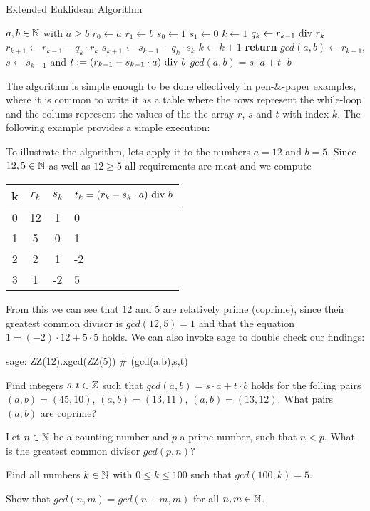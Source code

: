 \begin{algorithm}\caption{Extended Euklidean Algorithm}
\label{alg_ext_euclid_alg}
\begin{algorithmic}[0]
\Require $a,b \in \mathbb{N}$ with $a\geq b$
\State $r_0\gets a$
\State $r_1\gets b$
\State $s_0\gets 1$
\State $s_1\gets 0$
\State $k\gets 1$
\State $ q_k\gets r_{k-1} \text{ div } r_k $
\State $ r_{k + 1}\gets r_{k-1} -q_k \cdot r_k $
\State $ s_{k + 1}\gets s_{k-1} -q_k \cdot s_k $
\State $ k \gets k + 1 $
\EndWhile
\State \textbf{return} $gcd(a,b)\gets r_{k-1}$, $s\gets s_{k-1}$ and $ t: = (r_{k-1}-s_{k-1} \cdot a) \text{ div } b $ 
\EndProcedure
\Ensure $ gcd (a, b) = s \cdot a + t \cdot b $
\end{algorithmic}
\end{algorithm}
The algorithm is simple enough to be done effectively in pen-\&-paper examples, where it is common to write it as a table where the rows represent the while-loop and the colums represent the values of the the array $r$, $s$ and $t$ with index $k$. The following example provides a simple execution:
\begin{example} To illustrate the algorithm, lets apply it to the numbers $a=12$ and $b=5$. Since $12,5\in \mathbb{N}$ as well as $12\geq 5$ all requirements are meat and we compute
\begin{center}
  \begin{tabular}{c | c c l}
    k & $ r_k $ & $ s_k $ & $ t_k = (r_k-s_k \cdot a) \text{ div } b $ \\\hline
    0 & 12 & 1 & 0 \\
    1 & 5 & 0 & 1 \\
    2 & 2 & 1 & -2 \\
    3 & 1 & -2 & 5 \\
  \end{tabular}
\end{center}
From this we can see that $ 12 $ and $ 5 $ are relatively prime (coprime), since their greatest common divisor is $ gcd (12, 5) = 1 $ and that the equation $ 1 = (-2) \cdot 12 + 5 \cdot 5 $ holds. We can also invoke sage to double check our findings:
\begin{sagecommandline}
sage: ZZ(12).xgcd(ZZ(5)) # (gcd(a,b),s,t)
\end{sagecommandline}
\end{example}
\begin{exercise}
Find integers $s,t\in\mathbb{Z}$ such that $gcd(a,b)= s\cdot a +t\cdot b$ holds for the folling pairs $(a,b) = (45,10)$, $(a,b)=(13,11)$, $(a,b)=(13,12)$. What pairs $(a,b)$ are coprime?
\end{exercise}
\begin{exercise}
Let $n\in \mathbb{N}$ be a counting number and $p$ a prime number, such that $n<p$. What is the greatest common divisor $gcd(p,n)$?
\end{exercise}
\begin{exercise}
Find all numbers $k\in\mathbb{N}$ with $0\leq k \leq 100$ such that $gcd(100,k) = 5$.
\end{exercise}
\begin{exercise}
Show that $gcd(n,m) = gcd(n+m,m)$ for all $n,m\in\mathbb{N}$.
\end{exercise}
